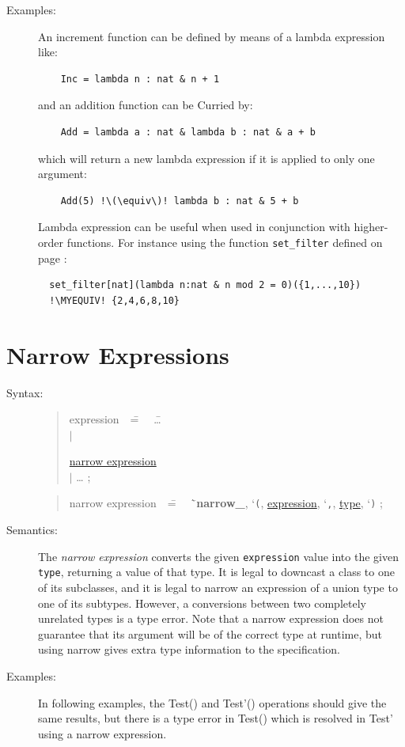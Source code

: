 \documentclass{overturerepchap}
\newcommand{\MYEQUIV}{$\equiv$}
\newcommand{\Lit}[1]{`{\tt #1}\Quote}
\newcommand{\Rule}[2]{
  \begin{quote}\begin{tabbing}
    #1\index{#1}\ \ \= = \ \ \= #2  ; %

  \end{tabbing}\end{quote}
  }
\newcommand{\Ruleref}[1]{
  \hyperlink{rule:#1}{#1}}
\newcommand{\dsep}{\\ \> $|$ \>}
\newcommand{\Lop}[1]{`{\bf\ttfamily #1}\Quote}
\begin{document}
{\begin{description}
\item[Examples:] An increment function can be defined by means of a lambda
  expression like:
  \begin{lstlisting}
    Inc = lambda n : nat & n + 1
  \end{lstlisting}
  and an addition function can be Curried by:
  \begin{lstlisting}
    Add = lambda a : nat & lambda b : nat & a + b
  \end{lstlisting}
  which will return a new lambda expression if it is applied to only one
  argument:
  \begin{lstlisting}
    Add(5) !\(\equiv\)! lambda b : nat & 5 + b
  \end{lstlisting}
  Lambda expression can be useful when used in conjunction with higher-order
  functions. For instance using the function \texttt{set\_filter}
  defined on page \pageref{setfilterdef}:
  \begin{lstlisting}
  set_filter[nat](lambda n:nat & n mod 2 = 0)({1,...,10})
  !\MYEQUIV! {2,4,6,8,10}
  \end{lstlisting}
\end{description}


\section{Narrow Expressions}

\begin{description}
\item[Syntax:]
  \Rule{expression}{
    \ldots \dsep
    \Ruleref{narrow expression} \dsep
    \ldots
    }

  \Rule{narrow expression}{
    \Lop{narrow\_},  \Lit{(}, \Ruleref{expression},  \Lit{,}, \Ruleref{type}, \Lit{)}
    }

    \item[Semantics:] The {\it narrow expression} converts the given {\tt expression} value into the given {\tt type},
returning a value of that type.
It is legal to downcast a class to one of its subclasses, and it is legal to narrow an expression of a union type
to one of its subtypes. However, a conversions between two completely unrelated types is a type error. Note that a
narrow expression does not guarantee that its argument will be of the correct type at runtime, but using narrow gives
extra type information to the specification.

    \item[Examples:] In following examples, the Test() and Test'() operations should give the same results,
    but there is a type error in Test() which is resolved in Test' using a narrow expression.


\end{description}}
\end{document}
